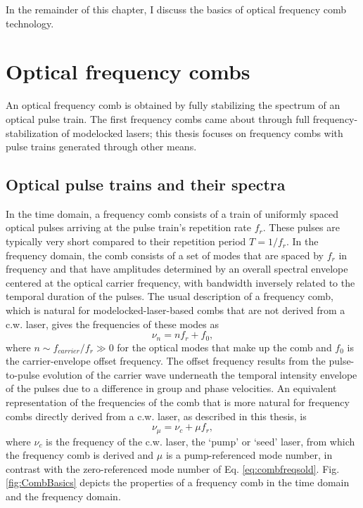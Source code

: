 In the remainder of this chapter, I discuss the basics of optical frequency comb technology.

\section{Optical frequency combs}

An optical frequency comb is obtained by fully stabilizing the spectrum of an optical pulse train. The first frequency combs came about through full frequency-stabilization of modelocked lasers; this thesis focuses on frequency combs with pulse trains generated through other means.

\subsection{Optical pulse trains and their spectra}

In the time domain, a frequency comb consists of a train of uniformly spaced optical pulses arriving at the pulse train's repetition rate $f_r$. These pulses are typically very short compared to their repetition period $T=1/f_r$. In the frequency domain, the comb consists of a set of modes that are spaced by $f_r$ in frequency and that have amplitudes determined by an overall spectral envelope centered at the optical carrier frequency, with bandwidth inversely related to the temporal duration of the pulses. The usual description of a frequency comb, which is natural for modelocked-laser-based combs that are not derived from a c.w. laser, gives the frequencies of these modes as 
\begin{equation}
\nu_n=nf_r+f_0, \label{eq:combfreqsold}
\end{equation} 
where $n\sim f_{carrier}/f_r\gg0$ for the optical modes that make up the comb and $f_0$ is the carrier-envelope offset frequency. The offset frequency results from the pulse-to-pulse evolution of the carrier wave underneath the temporal intensity envelope of the pulses due to a difference in group and phase velocities. An equivalent representation of the frequencies of the comb that is more natural for frequency combs directly derived from a c.w. laser, as described in this thesis, is
\begin{equation}
\nu_\mu=\nu_c+\mu f_r, \label{eq:combfreqsnew}
\end{equation} 
where $\nu_c$ is the frequency of the c.w. laser, the `pump' or `seed' laser, from which the frequency comb is derived and $\mu$ is a pump-referenced mode number, in contrast with the zero-referenced mode number of Eq. \ref{eq:combfreqsold}. Fig. \ref{fig:CombBasics} depicts the properties of a frequency comb in the time domain and the frequency domain.

